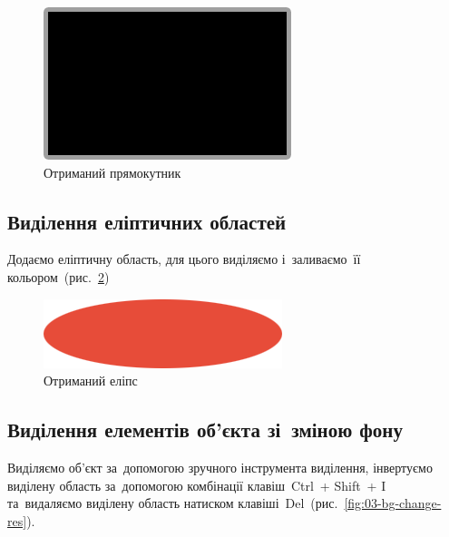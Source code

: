 \documentclass[
	a4paper,
	oneside,
	BCOR = 10mm,
	DIV = 12,
	12pt,
	headings = normal,
]{scrartcl}
\newcommand{\key}[1]{\textsf{#1}}
\begin{document}
			\begin{figure}[!htbp]
				\centering
				\includegraphics[height = 6\baselineskip]{./../01-solution/y03s01-multimedia-lab-02-02-p01.jpg}
				\caption{Отриманий прямокутник}
				\label{fig:01-rectangle-res}
			\end{figure}

		\subsection{Виділення еліптичних областей}
			Додаємо еліптичну область, для цього виділяємо і~заливаємо~її кольором~(рис.~\ref{fig:02-ellipse-res})

			\begin{figure}[!htbp]
				\centering
				\includegraphics[height = 5\baselineskip]{./../01-solution/y03s01-multimedia-lab-02-02-p02.png}
				\caption{Отриманий еліпс}
				\label{fig:02-ellipse-res}
			\end{figure}

		\subsection{Виділення елементів об'єкта зі~зміною фону}
			Виділяємо об'єкт за~допомогою зручного інструмента виділення, інвертуємо виділену область за~допомогою комбінації клавіш~\key{\textenglish{Ctrl}}~+ \key{\textenglish{Shift}}~+ \key{\textenglish{I}} та~видаляємо виділену область натиском клавіші~\key{Del}~(рис.~\ref{fig:03-bg-change-res}).
\end{document}

